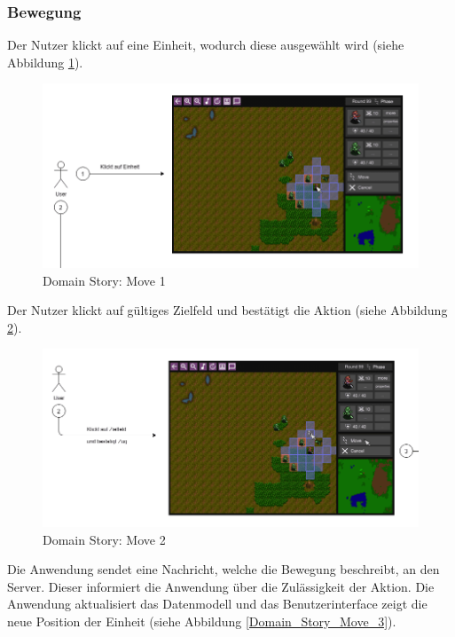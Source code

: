 \documentclass[12pt, titlepage]{scrartcl}
\begin{document}
		    \subsubsection{Bewegung}
		    	Der Nutzer klickt auf eine Einheit, wodurch diese  ausgew\"ahlt wird (siehe Abbildung \ref{Domain_Story_Move_1}).
		    	\begin{figure}[H] 
		    		\centering
		    		\includegraphics[width=\textwidth]{images/domain_stories/moveStory1.png}
		    		\caption{Domain Story: Move 1}
		    		\label{Domain_Story_Move_1}
		    	\end{figure}
			Der Nutzer klickt auf g\"ultiges Zielfeld und best\"atigt die Aktion (siehe Abbildung \ref{Domain_Story_Move_2}).
		    	\begin{figure}[H] 
		    		\centering
		    		\includegraphics[width=\textwidth]{images/domain_stories/moveStory2.png}
		    		\caption{Domain Story: Move 2}
		    		\label{Domain_Story_Move_2}
		    	\end{figure}
			Die Anwendung sendet eine Nachricht, welche die Bewegung beschreibt, an den Server. Dieser informiert die Anwendung \"uber die Zul\"assigkeit der Aktion. Die Anwendung aktualisiert das Datenmodell und das Benutzerinterface zeigt die neue Position der Einheit (siehe Abbildung \ref{Domain_Story_Move_3}).
\end{document}
